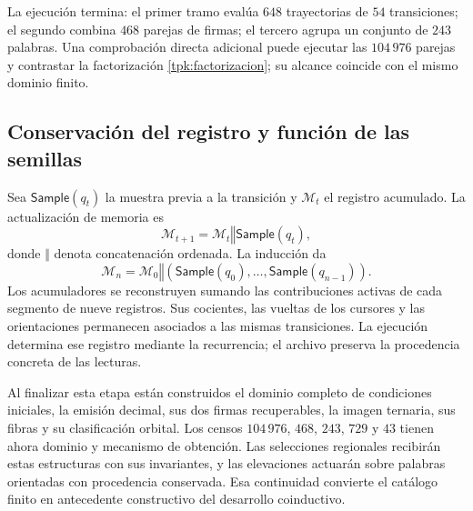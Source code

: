 La ejecución termina: el primer tramo evalúa \(648\) trayectorias de
\(54\) transiciones; el segundo combina \(468\) parejas de firmas; el
tercero agrupa un conjunto de \(243\) palabras. Una comprobación directa
adicional puede ejecutar las \(104\,976\) parejas y contrastar la
factorización \eqref{tpk:factorizacion}; su alcance coincide con el mismo
dominio finito.

\subsection{Conservación del registro y función de las semillas}
\label{tpk:conclusion}

Sea \(\mathsf{Sample}(q_t)\) la muestra previa a la transición y
\(\mathcal M_t\) el registro acumulado. La actualización de memoria es
\begin{equation}
 \mathcal M_{t+1}=\mathcal M_t\mathbin{\Vert}\mathsf{Sample}(q_t),
 \label{tpk:archivo}
\end{equation}
donde \(\Vert\) denota concatenación ordenada. La inducción da
\[
 \mathcal M_n=\mathcal M_0\mathbin{\Vert}
 (\mathsf{Sample}(q_0),\ldots,\mathsf{Sample}(q_{n-1})).
\]
Los acumuladores se reconstruyen sumando las contribuciones activas de
cada segmento de nueve registros. Sus cocientes, las vueltas de los
cursores y las orientaciones permanecen asociados a las mismas transiciones.
La ejecución determina ese registro mediante la recurrencia; el archivo
preserva la procedencia concreta de las lecturas.

Al finalizar esta etapa están construidos el dominio completo de condiciones
iniciales, la emisión decimal, sus dos firmas recuperables, la imagen ternaria,
sus fibras y su clasificación orbital. Los censos \(104\,976\), \(468\),
\(243\), \(729\) y \(43\) tienen ahora dominio y mecanismo de obtención.
Las selecciones regionales recibirán estas estructuras con sus invariantes,
y las elevaciones actuarán sobre palabras orientadas con procedencia
conservada. Esa continuidad convierte el catálogo finito en antecedente
constructivo del desarrollo coinductivo.
